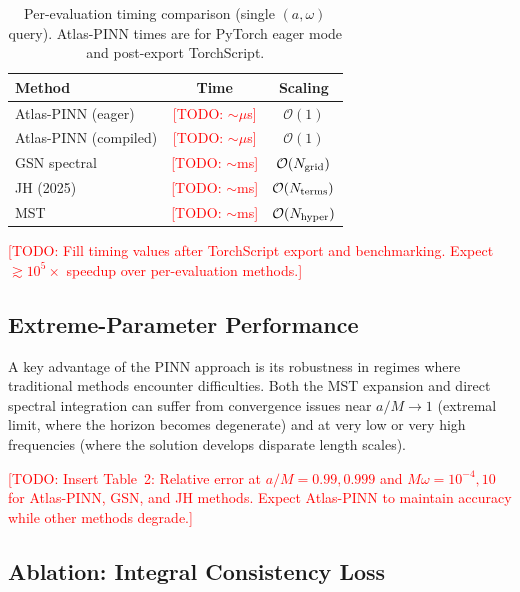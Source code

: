 \documentclass[aps,prd,twocolumn,superscriptaddress,nofootinbib]{revtex4-2}
\newcommand{\TODO}[1]{\textcolor{red}{[TODO: #1]}}
\begin{document}
\begin{table}[h]
  \centering
  \caption{Per-evaluation timing comparison (single $(a,\omega)$ query).
  Atlas-PINN times are for PyTorch eager mode and post-export TorchScript.}
  \label{tab:speed}
  \begin{tabular}{lcc}
    \toprule
    Method & Time & Scaling \\
    \midrule
    Atlas-PINN (eager)  & \TODO{$\sim\mu$s} & $\mathcal{O}(1)$ \\
    Atlas-PINN (compiled) & \TODO{$\sim\mu$s} & $\mathcal{O}(1)$ \\
    GSN spectral         & \TODO{$\sim$ms}  & $\mathcal{O}(N_{\rm grid})$ \\
    JH (2025)            & \TODO{$\sim$ms}  & $\mathcal{O}(N_{\rm terms})$ \\
    MST                  & \TODO{$\sim$ms}  & $\mathcal{O}(N_{\rm hyper})$ \\
    \bottomrule
  \end{tabular}
\end{table}

\TODO{Fill timing values after TorchScript export and benchmarking.  Expect
$\gtrsim 10^{5}\times$ speedup over per-evaluation methods.}

\subsection{Extreme-Parameter Performance}
\label{sec:results_extreme}

A key advantage of the PINN approach is its robustness in regimes where
traditional methods encounter difficulties.  Both the MST expansion and direct
spectral integration can suffer from convergence issues near $a/M \to 1$
(extremal limit, where the horizon becomes degenerate) and at very low or very
high frequencies (where the solution develops disparate length scales).

\TODO{Insert Table~2: Relative error at $a/M = 0.99, 0.999$ and
$M\omega = 10^{-4}, 10$ for Atlas-PINN, GSN, and JH methods.  Expect
Atlas-PINN to maintain accuracy while other methods degrade.}

\subsection{Ablation: Integral Consistency Loss}
\label{sec:results_ablation}
\end{document}
